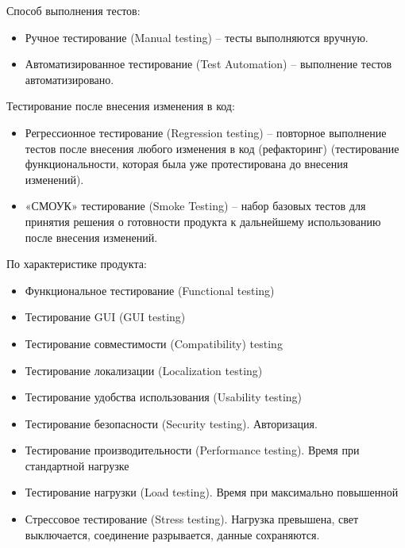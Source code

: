Способ выполнения тестов:

\begin{itemize}
    \item Ручное тестирование (Manual testing) – тесты выполняются вручную.

    \item Автоматизированное тестирование (Test Automation) –
        выполнение тестов автоматизировано.
\end{itemize}

Тестирование после внесения изменения в код:

\begin{itemize}
    \item Регрессионное тестирование (Regression testing) – повторное выполнение тестов
        после внесения любого изменения в код (рефакторинг) (тестирование функциональности, которая
        была уже протестирована до внесения изменений).

    \item «СМОУК» тестирование (Smoke Testing) – набор базовых тестов для принятия
        решения о готовности продукта к дальнейшему использованию после внесения
        изменений.
\end{itemize}

По характеристике продукта:

\begin{itemize}
    \item Функциональное тестирование (Functional testing)
    \item Тестирование GUI (GUI testing)
    \item Тестирование совместимости (Compatibility\Platform) testing 
    \item Тестирование локализации (Localization testing)
    \item Тестирование удобства использования (Usability testing)

    \item Тестирование безопасности (Security testing). Авторизация.

    \item Тестирование производительности (Performance testing). Время при
        стандартной нагрузке
    \item Тестирование нагрузки (Load testing). Время при максимально
        повышенной
    \item Стрессовое тестирование (Stress testing). Нагрузка превышена, свет
        выключается, соединение разрывается, данные сохраняются. 
\end{itemize}

